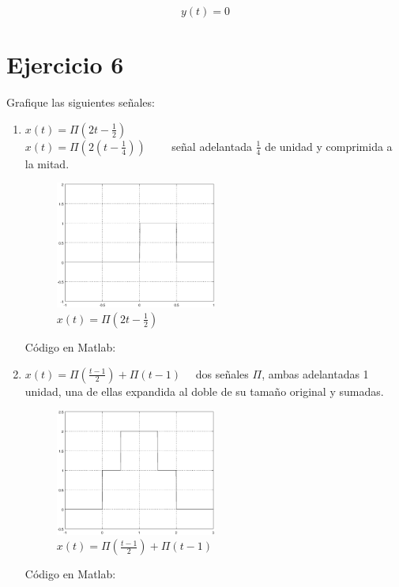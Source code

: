 \documentclass[10pt,a4paper]{report}
\begin{document}
\[ y\left(t\right)= 0 \] 

\section{Ejercicio 6}
Grafique las siguientes señales:
\begin{enumerate}
  \item $x(t)=\Pi \left(2t-\frac{1}{2}\right)$\\
  $x(t)=\Pi \left(2\left(t-\frac{1}{4}\right)\right)\qquad$ señal adelantada $\frac{1}{4}$ de unidad y comprimida a la mitad.
  
    \begin{figure}[H]
      \begin{center}
        \includegraphics[width=0.5\textwidth]{./Ejercicio6/IncisoA}
        \caption{$x(t)=\Pi \left(2t-\frac{1}{2}\right)$}
        \label{fig:Inciso A}
      \end{center}
    \end{figure}
    Código en Matlab:
    
    
  \item $x\left(t\right)=\Pi\left(\frac{t-1}{2}\right)+\Pi\left(t-1\right)\quad$ dos señales $\Pi$, ambas adelantadas 1 unidad, una de ellas expandida al doble de su tamaño original y sumadas.
    \begin{figure}[H]
      \begin{center}
        \includegraphics[width=0.5\textwidth]{./Ejercicio6/IncisoB}
        \caption{$x\left(t\right)=\Pi\left(\frac{t-1}{2}\right)+\Pi\left(t-1\right)$}
        \label{fig:Inciso B}
      \end{center}
    \end{figure}
    Código en Matlab:
    
    
\end{enumerate}
\end{document}
